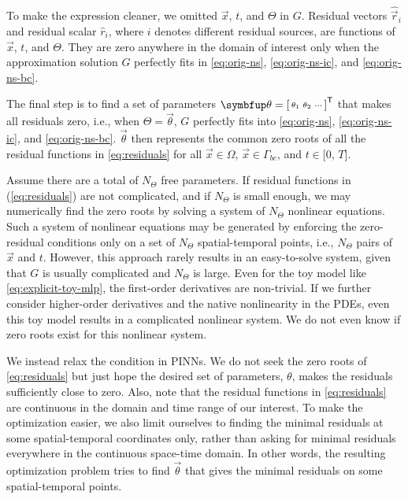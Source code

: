 To make the expression cleaner, we omitted $\vec{x}$, $t$, and $\Theta$ in $G$.
Residual vectors $\hat{\vec{r}}_i$ and residual scalar $\hat{r}_i$, where $i$ denotes different residual sources, are functions of $\vec{x}$, $t$, and $\Theta$.
They are zero anywhere in the domain of interest only when the approximation solution $G$ perfectly fits in \eqref{eq:orig-ns}, \eqref{eq:orig-ns-ic}, and \eqref{eq:orig-ns-bc}.

The final step is to find a set of parameters $\vec{\theta}=\begin{bsmallmatrix}\theta_1 & \theta_2 & \cdots\end{bsmallmatrix}^\mathsf{T}$ that makes all residuals zero, i.e., when $\Theta=\vec{\theta}$, $G$ perfectly fits into \eqref{eq:orig-ns}, \eqref{eq:orig-ns-ic}, and \eqref{eq:orig-ns-bc}.
$\vec{\theta}$ then represents the common zero roots of all the residual functions in \eqref{eq:residuals} for all $\vec{x} \in \Omega$, $\vec{x} \in \Gamma_{bc}$, and $t\in[0$, $T]$.

Assume there are a total of $N_\Theta$ free parameters.
If residual functions in (\ref{eq:residuals}) are not complicated, and if $N_\Theta$ is small enough, we may numerically find the zero roots by solving a system of $N_\Theta$ nonlinear equations.
Such a system of nonlinear equations may be generated by enforcing the zero-residual conditions only on a set of $N_\Theta$ spatial-temporal points, i.e., $N_\Theta$ pairs of $\vec{x}$ and $t$.
However, this approach rarely results in an easy-to-solve system, given that $G$ is usually complicated and $N_\Theta$ is large.
Even for the toy model like \eqref{eq:explicit-toy-mlp}, the first-order derivatives are non-trivial.
If we further consider higher-order derivatives and the native nonlinearity in the PDEs, even this toy model results in a complicated nonlinear system. 
We do not even know if zero roots exist for this nonlinear system.

We instead relax the condition in PINNs.
We do not seek the zero roots of \eqref{eq:residuals} but just hope the desired set of parameters, $\theta$, makes the residuals sufficiently close to zero.
Also, note that the residual functions in \eqref{eq:residuals} are continuous in the domain and time range of our interest.
To make the optimization easier, we also limit ourselves to finding the minimal residuals at some spatial-temporal coordinates only, rather than asking for minimal residuals everywhere in the continuous space-time domain. 
In other words, the resulting optimization problem tries to find $\vec{\theta}$ that gives the minimal residuals on some spatial-temporal points.

